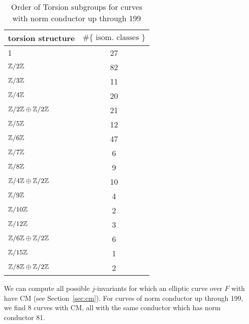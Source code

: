 \documentclass{amsart}
\begin{document}
\begin{center}
\begin{table}[h]
\caption{Order of Torsion subgroups for curves with norm conductor up through 199\label{table:tor-counts}}
\begin{tabular}{|l|c|}\hline
torsion structure    & $\#\{\text{ isom. classes }\}$ \\\hline
1                    & 27 \\\hline
$\mathbb{Z}/2\mathbb{Z}$             & 82 \\\hline
$\mathbb{Z}/3\mathbb{Z}$             & 11 \\\hline
$\mathbb{Z}/4\mathbb{Z}$             & 20 \\\hline
$\mathbb{Z}/2\mathbb{Z}\oplus\mathbb{Z}/2\mathbb{Z}$ & 21 \\\hline
$\mathbb{Z}/5\mathbb{Z}$             & 12 \\\hline
$\mathbb{Z}/6\mathbb{Z}$             & 47 \\\hline
$\mathbb{Z}/7\mathbb{Z}$             & 6  \\\hline
$\mathbb{Z}/8\mathbb{Z}$             & 9  \\\hline
$\mathbb{Z}/4\mathbb{Z}\oplus\mathbb{Z}/2\mathbb{Z}$ & 10 \\\hline
$\mathbb{Z}/9\mathbb{Z}$             & 4  \\\hline
$\mathbb{Z}/10\mathbb{Z}$            & 2  \\\hline
$\mathbb{Z}/12\mathbb{Z}$            & 3  \\\hline
$\mathbb{Z}/6\mathbb{Z}\oplus\mathbb{Z}/2\mathbb{Z}$ & 6  \\\hline
$\mathbb{Z}/15\mathbb{Z}$            & 1  \\\hline
$\mathbb{Z}/8\mathbb{Z}\oplus\mathbb{Z}/2\mathbb{Z}$ & 2  \\\hline
\end{tabular}
\end{table}
\end{center}


We can compute all possible $j$-invariants for which an elliptic curve
over $F$ with have CM (see Section~\ref{sec:cm}).  For curves of norm
conductor up through 199, we find 8 curves with CM, all with the same
conductor which has norm conductor 81.
\end{document}
